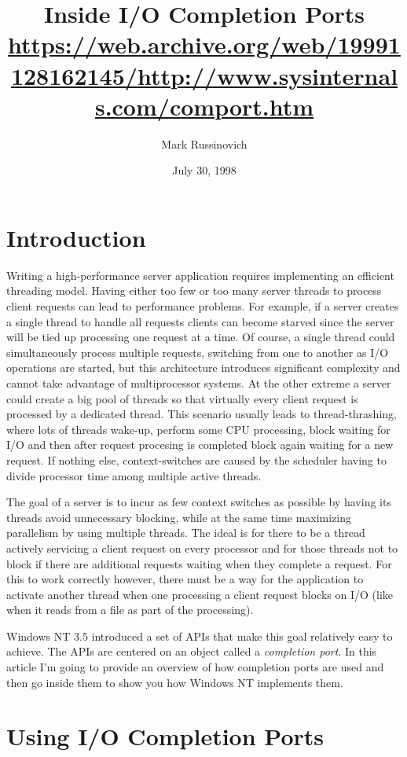 \documentclass[a4paper,12pt,notitlepage,twoside,openright]{article}
\title{Inside I/O Completion Ports\\\scriptsize \url{https://web.archive.org/web/19991128162145/http://www.sysinternals.com/comport.htm}}
\author{Mark Russinovich}
\date{July 30, 1998}
\begin{document}
\maketitle

\section{Introduction}

Writing a high-performance server application requires implementing an efficient threading model. Having either too few or too many server threads to process client requests can lead to performance problems. For example, if a server creates a single thread to handle all requests clients can become starved since the server will be tied up processing one request at a time. Of course, a single thread could simultaneously process multiple requests, switching from one to another as I/O operations are started, but this architecture introduces significant complexity and cannot take advantage of multiprocessor systems. At the other extreme a server could create a big pool of threads so that virtually every client request is processed by a dedicated thread. This scenario usually leads to thread-thrashing, where lots of threads wake-up, perform some CPU processing, block waiting for I/O and then after request procesing is completed block again waiting for a new request. If nothing else, context-switches are caused by the scheduler having to divide processor time among multiple active threads.

The goal of a server is to incur as few context switches as possible by having its threads avoid unnecessary blocking, while at the same time maximizing parallelism by using multiple threads. The ideal is for there to be a thread actively servicing a client request on every processor and for those threads not to block if there are additional requests waiting when they complete a request. For this to work correctly however, there must be a way for the application to activate another thread when one processing a client request blocks on I/O (like when it reads from a file as part of the processing).

Windows NT 3.5 introduced a set of APIs that make this goal relatively easy to achieve. The APIs are centered on an object called a \emph{completion port}. In this article I'm going to provide an overview of how completion ports are used and then go inside them to show you how Windows NT implements them.

\section{Using I/O Completion Ports}
\end{document}

